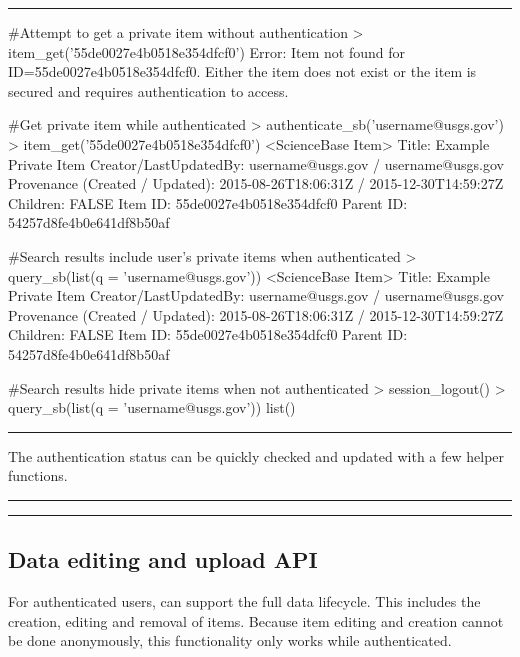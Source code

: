 \noindent\rule{\textwidth}{0.4pt}
\begin{example}
#Attempt to get a private item without authentication
> item_get('55de0027e4b0518e354dfcf0')
 Error: Item not found for ID=55de0027e4b0518e354dfcf0. Either the
 item does not exist or the item is secured and requires authentication to access.

#Get private item while authenticated
> authenticate_sb('username@usgs.gov')
> item_get('55de0027e4b0518e354dfcf0')
 <ScienceBase Item>
  Title: Example Private Item
  Creator/LastUpdatedBy:     username@usgs.gov / username@usgs.gov
  Provenance (Created / Updated):  2015-08-26T18:06:31Z / 2015-12-30T14:59:27Z
  Children: FALSE
  Item ID: 55de0027e4b0518e354dfcf0
  Parent ID: 54257d8fe4b0e641df8b50af

#Search results include user's private items when authenticated
> query_sb(list(q = 'username@usgs.gov'))
 <ScienceBase Item>
  Title: Example Private Item
  Creator/LastUpdatedBy:     username@usgs.gov / username@usgs.gov
  Provenance (Created / Updated):  2015-08-26T18:06:31Z / 2015-12-30T14:59:27Z
  Children: FALSE
  Item ID: 55de0027e4b0518e354dfcf0
  Parent ID: 54257d8fe4b0e641df8b50af

#Search results hide private items when not authenticated
> session_logout()
> query_sb(list(q = 'username@usgs.gov'))
list()
\end{example}
\noindent\rule{\textwidth}{0.4pt}

The authentication status can be quickly checked and updated 
with a few helper functions.

\noindent\rule{\textwidth}{0.4pt}
\noindent\rule{\textwidth}{0.4pt}

\subsection{Data editing and upload API}
For authenticated users,  can support
the full data lifecycle. This includes the creation, editing and removal
of items. Because item editing and creation cannot be done anonymously,
this functionality only works while authenticated.

